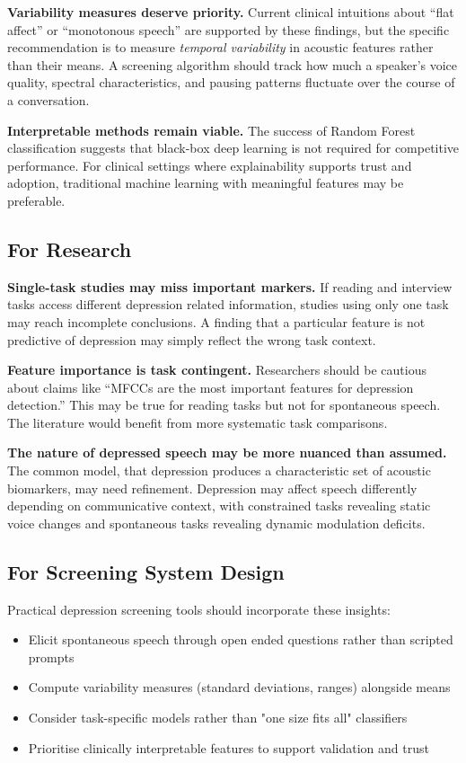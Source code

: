 \textbf{Variability measures deserve priority.} Current clinical intuitions about ``flat affect'' or ``monotonous speech'' are supported by these findings, but the specific recommendation is to measure \textit{temporal variability} in acoustic features rather than their means. A screening algorithm should track how much a speaker's voice quality, spectral characteristics, and pausing patterns fluctuate over the course of a conversation.

\textbf{Interpretable methods remain viable.} The success of Random Forest classification suggests that black-box deep learning is not required for competitive performance. For clinical settings where explainability supports trust and adoption, traditional machine learning with meaningful features may be preferable.

\subsection{For Research}

\textbf{Single-task studies may miss important markers.} If reading and interview tasks access different depression related information, studies using only one task may reach incomplete conclusions. A finding that a particular feature is not predictive of depression may simply reflect the wrong task context.

\textbf{Feature importance is task contingent.} Researchers should be cautious about claims like ``MFCCs are the most important features for depression detection.'' This may be true for reading tasks but not for spontaneous speech. The literature would benefit from more systematic task comparisons.

\textbf{The nature of depressed speech may be more nuanced than assumed.} The common model, that depression produces a characteristic set of acoustic biomarkers, may need refinement. Depression may affect speech differently depending on communicative context, with constrained tasks revealing static voice changes and spontaneous tasks revealing dynamic modulation deficits.

\subsection{For Screening System Design}

Practical depression screening tools should incorporate these insights:

\begin{itemize}
    \item Elicit spontaneous speech through open ended questions rather than scripted prompts
    \item Compute variability measures (standard deviations, ranges) alongside means
    \item Consider task-specific models rather than "one size fits all" classifiers
    \item Prioritise clinically interpretable features to support validation and trust
\end{itemize}

